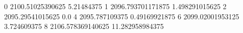 0 2100.51025390625 5.21484375
1 2096.793701171875 1.498291015625
2 2095.29541015625 0.0
4 2095.787109375 0.49169921875
6 2099.02001953125 3.724609375
8 2106.578369140625 11.282958984375
